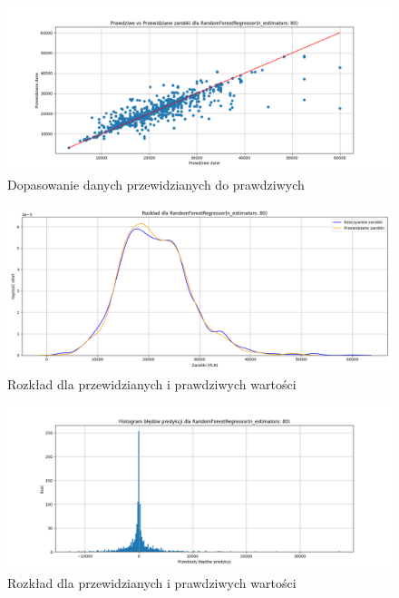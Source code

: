 \documentclass[a4paper]{article}
\begin{document}
\begin{figure}[H]
    \centering
    \includegraphics[width=\textwidth]{../analysis/plots/wyniki/0.8&0.2/RandomForestRegressor/scatter.png}
    \caption{Dopasowanie danych przewidzianych do prawdziwych}
\end{figure}

\begin{figure}[H]
    \centering
    \includegraphics[width=\textwidth]{../analysis/plots/wyniki/0.8&0.2/RandomForestRegressor/salary_dist.png}
    \caption{Rozkład dla przewidzianych i prawdziwych wartości}
\end{figure}

\begin{figure}[H]
    \centering
    \includegraphics[width=\textwidth]{../analysis/plots/wyniki/0.8&0.2/RandomForestRegressor/errors.png}
    \caption{Rozkład dla przewidzianych i prawdziwych wartości}
\end{figure}
\end{document}
